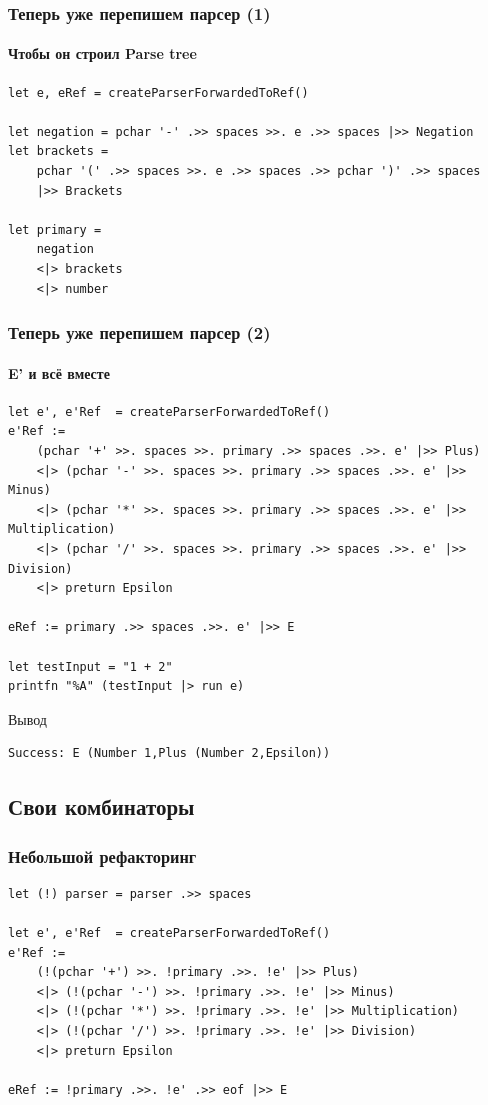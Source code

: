 \documentclass{../../slides-style}
\begin{document}
    \begin{frame}[fragile]
        \frametitle{Теперь уже перепишем парсер (1)}
        \framesubtitle{Чтобы он строил Parse tree}
        \begin{verbatim}
let e, eRef = createParserForwardedToRef()

let negation = pchar '-' .>> spaces >>. e .>> spaces |>> Negation
let brackets = 
    pchar '(' .>> spaces >>. e .>> spaces .>> pchar ')' .>> spaces
    |>> Brackets

let primary = 
    negation
    <|> brackets
    <|> number

        \end{verbatim}
    \end{frame}

    \begin{frame}[fragile]
        \frametitle{Теперь уже перепишем парсер (2)}
        \framesubtitle{E' и всё вместе}
        \begin{small}
            \begin{verbatim}
let e', e'Ref  = createParserForwardedToRef()
e'Ref := 
    (pchar '+' >>. spaces >>. primary .>> spaces .>>. e' |>> Plus)
    <|> (pchar '-' >>. spaces >>. primary .>> spaces .>>. e' |>> Minus)
    <|> (pchar '*' >>. spaces >>. primary .>> spaces .>>. e' |>> Multiplication)
    <|> (pchar '/' >>. spaces >>. primary .>> spaces .>>. e' |>> Division)
    <|> preturn Epsilon

eRef := primary .>> spaces .>>. e' |>> E

let testInput = "1 + 2"
printfn "%A" (testInput |> run e)
            \end{verbatim}

            \begin{exampleblock}{Вывод}
                \begin{verbatim}
Success: E (Number 1,Plus (Number 2,Epsilon))
                \end{verbatim}
            \end{exampleblock}
        \end{small}
    \end{frame}

    \subsection{Свои комбинаторы}

    \begin{frame}[fragile]
        \frametitle{Небольшой рефакторинг}
        \begin{verbatim}
let (!) parser = parser .>> spaces

let e', e'Ref  = createParserForwardedToRef()
e'Ref := 
    (!(pchar '+') >>. !primary .>>. !e' |>> Plus)
    <|> (!(pchar '-') >>. !primary .>>. !e' |>> Minus)
    <|> (!(pchar '*') >>. !primary .>>. !e' |>> Multiplication)
    <|> (!(pchar '/') >>. !primary .>>. !e' |>> Division)
    <|> preturn Epsilon

eRef := !primary .>>. !e' .>> eof |>> E
        \end{verbatim}
    \end{frame}
\end{document}
